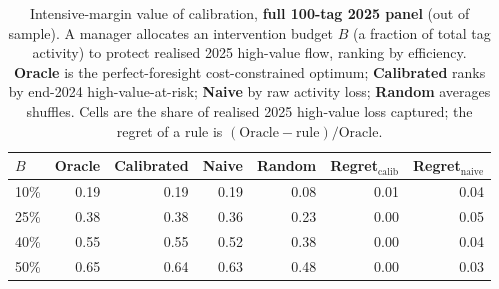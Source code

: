 \begin{table}[ht]
\centering
\caption{Intensive-margin value of calibration, \textbf{full 100-tag 2025 panel} (out of sample). A manager allocates an intervention budget $B$ (a fraction of total tag activity) to protect realised 2025 high-value flow, ranking by efficiency. \textbf{Oracle} is the perfect-foresight cost-constrained optimum; \textbf{Calibrated} ranks by end-2024 high-value-at-risk; \textbf{Naive} by raw activity loss; \textbf{Random} averages shuffles. Cells are the share of realised 2025 high-value loss captured; the regret of a rule is $(\text{Oracle}-\text{rule})/\text{Oracle}$.}
\label{tab:vtd_voi}
\small
\begin{tabular}{lrrrrrr}
\toprule
$B$ & Oracle & Calibrated & Naive & Random & Regret$_{\text{calib}}$ & Regret$_{\text{naive}}$ \\
\midrule
10\% & 0.19 & 0.19 & 0.19 & 0.08 & 0.01 & 0.04 \\
25\% & 0.38 & 0.38 & 0.36 & 0.23 & 0.00 & 0.05 \\
40\% & 0.55 & 0.55 & 0.52 & 0.38 & 0.00 & 0.04 \\
50\% & 0.65 & 0.64 & 0.63 & 0.48 & 0.00 & 0.03 \\
\bottomrule
\end{tabular}
\end{table}